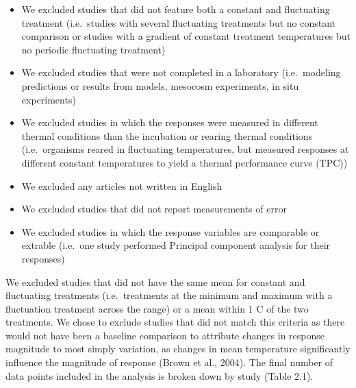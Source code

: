 \documentclass[12pt,twoside]{reedthesis}
\providecommand{\tightlist}{%
  \setlength{\itemsep}{0pt}\setlength{\parskip}{0pt}}
\begin{document}
\begin{itemize}
\tightlist
\item
  We excluded studies that did not feature both a constant and fluctuating treatment (i.e.~studies with several fluctuating treatments but no constant comparison or studies with a gradient of constant treatment temperatures but no periodic fluctuating treatment)
\item
  We excluded studies that were not completed in a laboratory (i.e.~modeling predictions or results from models, mesocosm experiments, in situ experiments)
\item
  We excluded studies in which the responses were measured in different thermal conditions than the incubation or rearing thermal conditions (i.e.~organisms reared in fluctuating temperatures, but measured responses at different constant temperatures to yield a thermal performance curve (TPC))
\item
  We excluded any articles not written in English
\item
  We excluded studies that did not report measurements of error
\item
  We excluded studies in which the response variables are comparable or extrable (i.e.~one study performed Principal component analysis for their responses)
\end{itemize}
We excluded studies that did not have the same mean for constant and fluctuating treatments (i.e.~treatments at the minimum and maximum with a fluctuation treatment across the range) or a mean within 1 C of the two treatments. We chose to exclude studies that did not match this criteria as there would not have been a baseline comparison to attribute changes in response magnitude to most simply variation, as changes in mean temperature significantly influence the magnitude of response (Brown et al., 2004). The final number of data points included in the analysis is broken down by study (Table 2.1).
\end{document}
